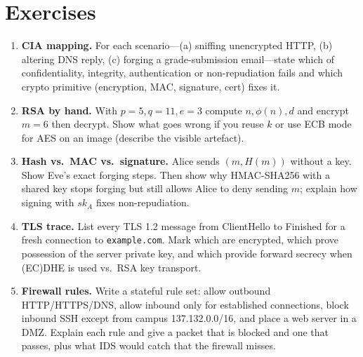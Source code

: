 \section{Exercises}\label{sec:ch08-exercises}
\begin{enumerate}[label=E8.\arabic*, leftmargin=*, itemsep=0.8em]
    \item \textbf{CIA mapping.} For each scenario---(a) sniffing unencrypted HTTP, (b) altering DNS reply, (c) forging a grade-submission email---state which of confidentiality, integrity, authentication or non-repudiation fails and which crypto primitive (encryption, MAC, signature, cert) fixes it.
    \item \textbf{RSA by hand.} With $p=5,q=11,e=3$ compute $n,\phi(n),d$ and encrypt $m=6$ then decrypt. Show what goes wrong if you reuse $k$ or use ECB mode for AES on an image (describe the visible artefact).
    \item \textbf{Hash vs.\ MAC vs.\ signature.} Alice sends $(m,H(m))$ without a key. Show Eve's exact forging steps. Then show why HMAC-SHA256 with a shared key stops forging but still allows Alice to deny sending $m$; explain how signing with $sk_A$ fixes non-repudiation.
    \item \textbf{TLS trace.} List every TLS 1.2 message from ClientHello to Finished for a fresh connection to \texttt{example.com}. Mark which are encrypted, which prove possession of the server private key, and which provide forward secrecy when (EC)DHE is used vs.\ RSA key transport.
    \item \textbf{Firewall rules.} Write a stateful rule set: allow outbound HTTP/HTTPS/DNS, allow inbound only for established connections, block inbound SSH except from campus 137.132.0.0/16, and place a web server in a DMZ. Explain each rule and give a packet that is blocked and one that passes, plus what IDS would catch that the firewall misses.
\end{enumerate}
